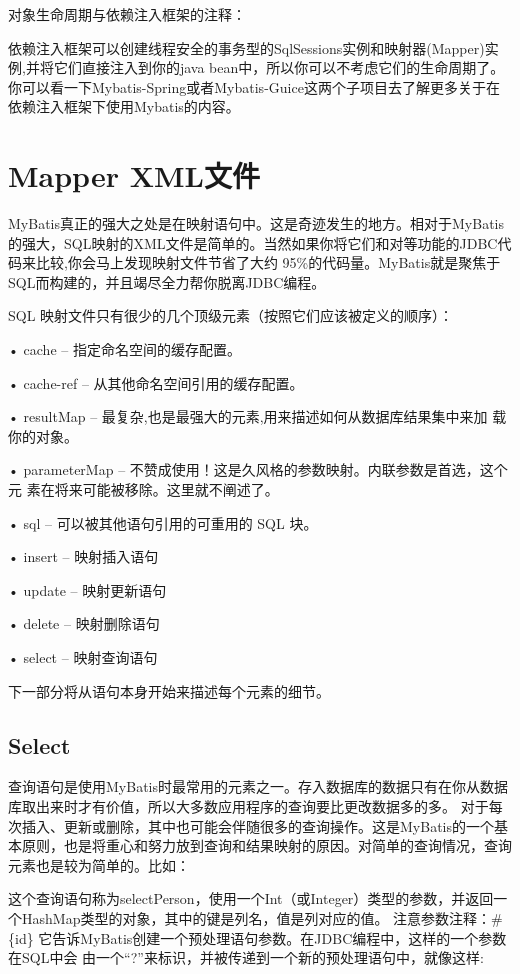 对象生命周期与依赖注入框架的注释：

依赖注入框架可以创建线程安全的事务型的SqlSessions实例和映射器(Mapper)实例,并将它们直接注入到你的java bean中，所以你可以不考虑它们的生命周期了。你可以看一下Mybatis-Spring或者Mybatis-Guice这两个子项目去了解更多关于在依赖注入框架下使用Mybatis的内容。

\section{Mapper XML文件}
MyBatis真正的强大之处是在映射语句中。这是奇迹发生的地方。相对于MyBatis的强大，SQL映射的XML文件是简单的。当然如果你将它们和对等功能的JDBC代码来比较,你会马上发现映射文件节省了大约 95\%的代码量。MyBatis就是聚焦于 SQL而构建的，并且竭尽全力帮你脱离JDBC编程。

SQL 映射文件只有很少的几个顶级元素（按照它们应该被定义的顺序）：

•	cache – 指定命名空间的缓存配置。

•	cache-ref – 从其他命名空间引用的缓存配置。

•	resultMap – 最复杂,也是最强大的元素,用来描述如何从数据库结果集中来加 载你的对象。

•	parameterMap – 不赞成使用！这是久风格的参数映射。内联参数是首选，这个元 素在将来可能被移除。这里就不阐述了。

•	sql – 可以被其他语句引用的可重用的 SQL 块。

•	insert – 映射插入语句

•	update – 映射更新语句

•	delete – 映射删除语句

•	select – 映射查询语句

下一部分将从语句本身开始来描述每个元素的细节。
\subsection{Select}
查询语句是使用MyBatis时最常用的元素之一。存入数据库的数据只有在你从数据库取出来时才有价值，所以大多数应用程序的查询要比更改数据多的多。 对于每次插入、更新或删除，其中也可能会伴随很多的查询操作。这是MyBatis的一个基本原则，也是将重心和努力放到查询和结果映射的原因。对简单的查询情况，查询元素也是较为简单的。比如：



这个查询语句称为selectPerson，使用一个Int（或Integer）类型的参数，并返回一个HashMap类型的对象，其中的键是列名，值是列对应的值。
注意参数注释：\#\{id\} 
它告诉MyBatis创建一个预处理语句参数。在JDBC编程中，这样的一个参数在SQL中会 由一个“?”来标识，并被传递到一个新的预处理语句中，就像这样:

